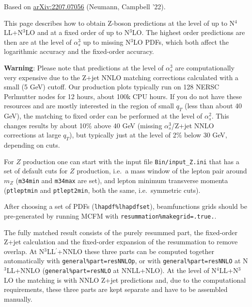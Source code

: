 \newpage

\label{n3losec}

Based on \href{https://arxiv.org/abs/2207.07056}{arXiv:2207.07056} (Neumann, Campbell '22).

This page describes how to obtain Z-boson predictions at the level of up
to N$^4$LL+N$^3$LO and at a fixed order of up to N$^3$LO. The
highest order predictions are then are at the level of $\alpha_s^3$ up
to missing N$^3$LO PDFs, which both affect the logarithmic accuracy
and the fixed-order accuracy.

\textbf{Warning}: Please note that predictions at the level of
$\alpha_s^3$ are computationally very expensive due to the Z+jet NNLO
matching corrections calculated with a small (5 GeV) cutoff. Our
production plots typically run on 128 NERSC Perlmutter nodes for 12
hours, about 100k CPU hours. If you do not have these resources and are
mostly interested in the region of small $q_T$ (less than about 40 GeV), the
matching to fixed order can be performed at the level of $\alpha_s^2$.
This changes results by about 10\% above 40 GeV (missing
$\alpha_s^3$/Z+jet NNLO corrections at large $q_T$), but typically
just at the level of 2\% below 30 GeV, depending on cuts.

For $Z$ production one can start with the input file
\texttt{Bin/input\_Z.ini} that has a set of default cuts for $Z$
production, i.e.~a mass window of the lepton pair around $m_Z$
(\texttt{m34min} and \texttt{m34max} are set), and lepton minimum
transverse momenta (\texttt{ptleptmin} and \texttt{ptlept2min}, both the
same, i.e.~symmetric cuts).

After choosing a set of PDFs (\texttt{lhapdf\%lhapdfset}), beamfunctions
grids should be pre-generated by running MCFM with
\texttt{resummation\%makegrid=.true.}.



The fully matched result consists of the purely resummed part, the
fixed-order Z+jet calculation and the fixed-order expansion of the
resummation to remove overlap. At N$^3$LL$^\prime$+NNLO these three
parts can be computed together automatically with
\texttt{general\%part=resNNLOp}, or with \texttt{general\%part=resNNLO}
at N$^3$LL+NNLO (\texttt{general\%part=resNLO} at NNLL+NLO). At the
level of N$^4$LL+N$^3$LO the matching is with NNLO Z+jet predictions
and, due to the computational requirements, these three parts are kept
separate and have to be assembled manually.


